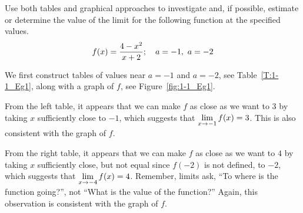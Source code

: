\begin{example} \label{Ex:1.1.Eg1}
Use both tables and graphical approaches to investigate and, if possible, estimate or determine the value of the limit for the following function at the specified values.  
\[ \displaystyle f(x) = \frac{4-x^2}{x+2}; \quad a = -1, \ a = -2 \]

\solution We first construct tables of values near $a = -1$ and $a = -2$, see Table~\ref{T:1-1_Eg1}, along with a graph of $f$, see Figure~\ref{fig:1-1_Eg1}.  

From the left table, it appears that we can make $f$ as close as we want to $3$ by taking $x$ sufficiently close to $-1$, which suggests that $\displaystyle \lim_{x \to -1} f(x) = 3$.	This is also consistent with the graph of $f$.  

From the right table, it appears that we can make $f$ as close as we want to $4$ by taking $x$ sufficiently close, but not equal since $f(-2)$ is not defined, to $-2$, which suggests that $\displaystyle \lim_{x \to -4} f(x) = 4$.	Remember, limits ask, ``To where is the function going?'', not ``What is the value of the function?''  Again, this observation is  consistent with the graph of $f$.  



\end{example}

